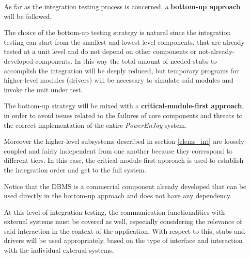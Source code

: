 As far as the integration testing process is concerned, a \textbf{bottom-up approach} will be followed. 

The choice of the bottom-up testing strategy is natural since the integration testing can start from the smallest and lowest-level components, that are already tested at a unit level and do not depend on other components or not-already-developed components. In this way the total amount of needed stubs to accomplish the integration will be deeply reduced, but temporary programs for higher-level modules (drivers) will be necessary to simulate said modules and invoke the unit under test.

The bottom-up strategy will be mixed with a \textbf{critical-module-first approach}, in order to avoid issues related to the failures of core components and threats to the correct implementation of the entire \emph{PowerEnJoy} system.

Moreover the higher-level subsystems described in section \ref{elems_int} are loosely coupled and fairly independent from one another because they correspond to different tiers. In this case, the critical-module-first approach is used to establish the integration order and get to the full system.

Notice that the DBMS is a commercial component already developed that can be used directly in the bottom-up approach and does not have any dependency.

At this level of integration testing, the communication functionalities with external systems must be covered as well, especially considering the relevance of said interaction in the context of the application. With respect to this, stubs and  drivers will be used appropriately, based on the type of interface and interaction with the individual external systems.